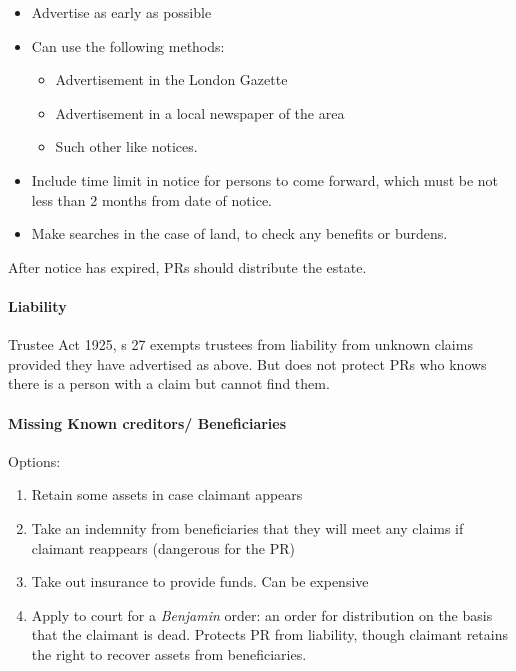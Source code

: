 \documentclass[
]{article}
\providecommand{\tightlist}{%
  \setlength{\itemsep}{0pt}\setlength{\parskip}{0pt}}
\begin{document}
\begin{itemize}
\tightlist
\item
  Advertise as early as possible
\item
  Can use the following methods:

  \begin{itemize}
  \tightlist
  \item
    Advertisement in the London Gazette
  \item
    Advertisement in a local newspaper of the area
  \item
    Such other like notices.
  \end{itemize}
\item
  Include time limit in notice for persons to come forward, which must
  be not less than 2 months from date of notice.
\item
  Make searches in the case of land, to check any benefits or burdens.
\end{itemize}

After notice has expired, PRs should distribute the estate.

\hypertarget{liability}{%
\paragraph{Liability}\label{liability}}

Trustee Act 1925, s 27 exempts trustees from liability from unknown
claims provided they have advertised as above. But does not protect PRs
who knows there is a person with a claim but cannot find them.

\hypertarget{missing-known-creditors-beneficiaries}{%
\paragraph{Missing Known creditors/
Beneficiaries}\label{missing-known-creditors-beneficiaries}}

Options:

\begin{enumerate}
\def\labelenumi{\arabic{enumi}.}
\tightlist
\item
  Retain some assets in case claimant appears
\item
  Take an indemnity from beneficiaries that they will meet any claims if
  claimant reappears (dangerous for the PR)
\item
  Take out insurance to provide funds. Can be expensive
\item
  Apply to court for a \emph{Benjamin} order: an order for distribution
  on the basis that the claimant is dead. Protects PR from liability,
  though claimant retains the right to recover assets from
  beneficiaries.
\end{enumerate}
\end{document}
